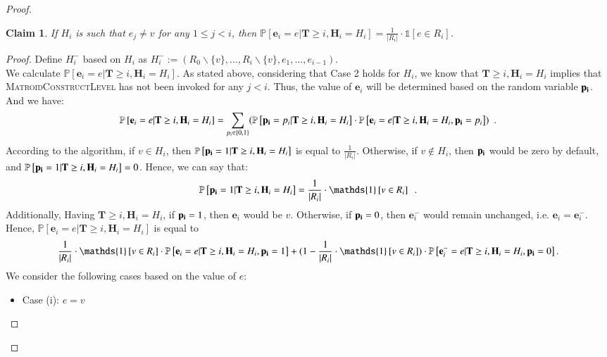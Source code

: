 \documentclass[11pt]{article}
\newtheorem{claim}{Claim}[section]
\renewcommand{\Pr}[1]{\ensuremath{\mathbb{P}\left[#1\right]}}
\newcommand{\ind}[1]{\ensuremath{\mathds{1}\left[#1\right]}}
\newcommand{\MatroidConstLevel}{\textsc{MatroidConstructLevel}}
\newcommand{\bE}{\ensuremath{\mathbf{e}}}
\newcommand{\bT}{\ensuremath{\mathbf{T}}}
\newcommand{\bH}{\ensuremath{\mathbf{H}}}
\begin{document}
\begin{proof}
\begin{claim}
\label{insertcase2}
If $H_i$ is such that $e_j \neq v$ for any $1 \le j < i$, then  
$\Pr{\bE_i = e | \bT \geq i, \bH_i = H_i} = \frac{1}{|R_i|} \cdot \ind{e \in R_i}$.
\end{claim}

\begin{proof}
Define $H_i^-$ based on $H_i$ as $ H_i^- := 
    (R_0 \backslash \{v\} , \dots, R_i \backslash \{v\}, e_1, \dots, e_{i-1})$.
    ~\\
We calculate $\Pr{\bE_i = e|\bT \geq i, \bH_i = H_i}$. 
As stated above, considering that Case 2 holds for $H_i$, we know that 
$\bT \geq i, \bH_i = H_i$ implies that \MatroidConstLevel{} has not been invoked for any $j < i$. Thus, the value of $\bE_i$ will be determined based on the random variable $\bold{p_i}$. And we have: 
$$\Pr{\bE_i = e|\bT \geq i, \bH_i = H_i} = 
\sum_{p_i \in \{0, 1\}}
(\Pr{\bold{p_i} = p_i|\bT \geq i, \bH_i = H_i} \cdot
\Pr{\bE_i = e|\bT \geq i, \bH_i = H_i, \bold{p_i} = p_i}) \enspace .$$
According to the algorithm, if $v \in H_i$, then $\Pr{\bold{p_i} = 1|\bT \geq i, \bH_i = H_i}$ is equal to $\frac{1}{|R_i|}$. Otherwise, if $v \notin H_i$, then $\bold{p_i}$ would be zero by default, and $\Pr{\bold{p_i} = 1|\bT \geq i, \bH_i = H_i} = 0$. Hence, we can say that: 
$$\Pr{\bold{p_i} = 1|\bT \geq i, \bH_i = H_i} = 
\frac{1}{|R_i|} \cdot \ind{v \in R_i} \enspace.$$
Additionally, Having $\bT \geq i, \bH_i = H_i$, 
 if $\bold{p_i} = 1$, then $\bE_i$ would be $v$. 
Otherwise, if $\bold{p_i} = 0$, then $\bE_i^-$ would remain unchanged, i.e. $\bE_i = \bE_i^-$.  
Hence, $\Pr{\bE_i = e|\bT \geq i, \bH_i = H_i}$ is equal to 
$$
\frac{1}{|R_i|} \cdot \ind{v \in R_i} \cdot
\Pr{\bE_i = e|\bT \geq i, \bH_i = H_i, \bold{p_i} = 1} 
+ (1 - \frac{1}{|R_i|} \cdot \ind{v \in R_i})\cdot
\Pr{\bE_i^- = e|\bT \geq i, \bH_i = H_i, \bold{p_i} = 0}
.$$
We consider the following cases based on the value of $e$: 
\begin{itemize}
\item Case (i): $e = v$ 


\end{itemize}
\end{proof}
\end{proof}
\end{document}
